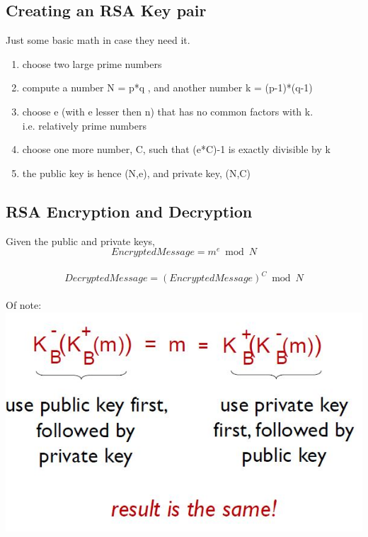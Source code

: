 \documentclass{article}
\begin{document}
\par
\subsection{Creating an RSA Key pair}
Just some basic math in case they need it.\\

\begin{enumerate}
    \item choose two large prime numbers
    \item compute a number N = p*q , and another number k = (p-1)*(q-1)
    \item choose e (with e lesser then n) that has no common factors with k.\\
    i.e. relatively prime numbers
    \item choose one more number, C, such that (e*C)-1 is exactly divisible by k
    \item the public key is hence (N,e), and private key, (N,C)\\
\end{enumerate}

\subsection{RSA Encryption and Decryption}

Given the public and private keys,\\
\[Encrypted Message = m^e \bmod N\]\\
\[Decrypted Message = (Encrypted Message)^C \bmod N\]\\
Of note:\\
\includegraphics{RSAencryptdecrypt.JPG}\\
\end{document}
